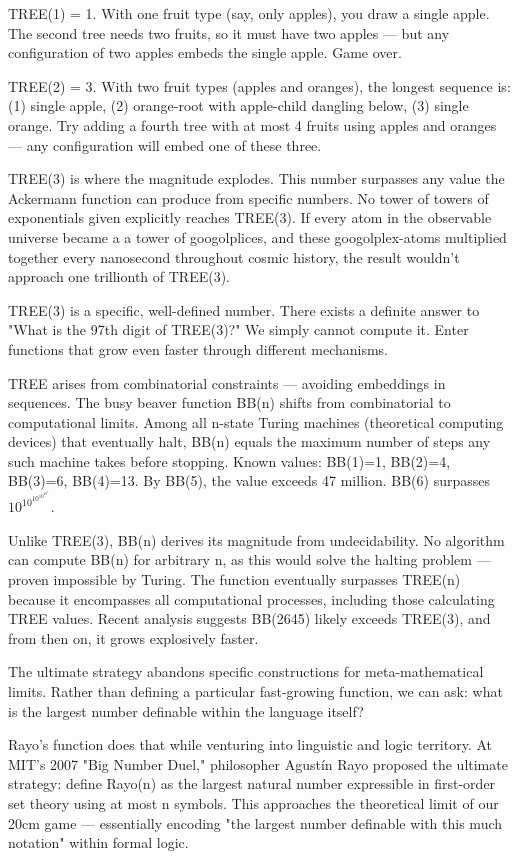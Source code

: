 TREE(1) = 1. With one fruit type (say, only apples), you draw a single apple. The second tree needs two fruits, so it must have two apples — but any configuration of two apples embeds the single apple. Game over.

TREE(2) = 3. With two fruit types (apples and oranges), the longest sequence is: (1) single apple, (2) orange-root with apple-child dangling below, (3) single orange. Try adding a fourth tree with at most 4 fruits using apples and oranges — any configuration will embed one of these three.

TREE(3) is where the magnitude explodes. This number surpasses any value the Ackermann function can produce from specific numbers. No tower of towers of exponentials given explicitly reaches TREE(3). If every atom in the observable universe became a a tower of googolplices, and these googolplex-atoms multiplied together every nanosecond throughout cosmic history, the result wouldn't approach one trillionth of TREE(3).

TREE(3) is a specific, well-defined number. There exists a definite answer to "What is the 97th digit of TREE(3)?" We simply cannot compute it. Enter functions that grow even faster through different mechanisms.

TREE arises from combinatorial constraints — avoiding embeddings in sequences. The busy beaver function BB(n) shifts from combinatorial to computational limits. Among all n-state Turing machines (theoretical computing devices) that eventually halt, BB(n) equals the maximum number of steps any such machine takes before stopping. Known values: BB(1)=1, BB(2)=4, BB(3)=6, BB(4)=13. By BB(5), the value exceeds 47 million. BB(6) surpasses $10^{10^{10^{10^{10^7}}}}$.

Unlike TREE(3), BB(n) derives its magnitude from undecidability. No algorithm can compute BB(n) for arbitrary n, as this would solve the halting problem — proven impossible by Turing. The function eventually surpasses TREE(n) because it encompasses all computational processes, including those calculating TREE values. Recent analysis suggests BB(2645) likely exceeds TREE(3), and from then on, it grows explosively faster.

The ultimate strategy abandons specific constructions for meta-mathematical limits. Rather than defining a particular fast-growing function, we can ask: what is the largest number definable within the language itself?

Rayo's function does that while venturing into linguistic and logic territory. At MIT's 2007 "Big Number Duel," philosopher Agustín Rayo proposed the ultimate strategy: define Rayo(n) as the largest natural number expressible in first-order set theory using at most n symbols. This approaches the theoretical limit of our 20cm game — essentially encoding "the largest number definable with this much notation" within formal logic. 

